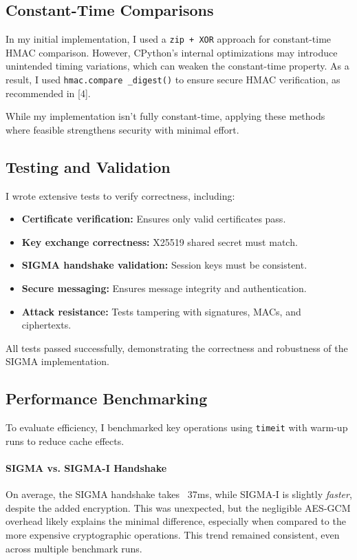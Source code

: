 \documentclass[twoside,a4paper,12pt]{article}
\begin{document}
\subsection{Constant-Time Comparisons}
\label{subsec:constant_time}

In my initial implementation, I used a \texttt{zip + XOR} approach for constant-time HMAC comparison. However, CPython's internal optimizations may introduce unintended timing variations, which can weaken the constant-time property. As a result, I used \texttt{hmac.compare \_digest()} to ensure secure HMAC verification, as recommended in [4].

While my implementation isn't fully constant-time, applying these methods where feasible strengthens security with minimal effort. 

\subsection{Testing and Validation}
\label{subsec:sigma_testing}

I wrote extensive tests to verify correctness, including:
\begin{itemize}
    \item \textbf{Certificate verification:} Ensures only valid certificates pass.
    \item \textbf{Key exchange correctness:} X25519 shared secret must match.
    \item \textbf{SIGMA handshake validation:} Session keys must be consistent.
    \item \textbf{Secure messaging:} Ensures message integrity and authentication.
    \item \textbf{Attack resistance:} Tests tampering with signatures, MACs, and ciphertexts.
\end{itemize}
All tests passed successfully, demonstrating the correctness and robustness of the SIGMA implementation.

\subsection{Performance Benchmarking}
To evaluate efficiency, I benchmarked key operations using \texttt{timeit} with warm-up runs to reduce cache effects.

\paragraph{SIGMA vs. SIGMA-I Handshake}
On average, the SIGMA handshake takes ~37ms, while SIGMA-I is slightly \textit{faster}, despite the added encryption. This was unexpected, but the negligible AES-GCM overhead likely explains the minimal difference, especially when compared to the more expensive cryptographic operations. This trend remained consistent, even across multiple benchmark runs.
\end{document}
